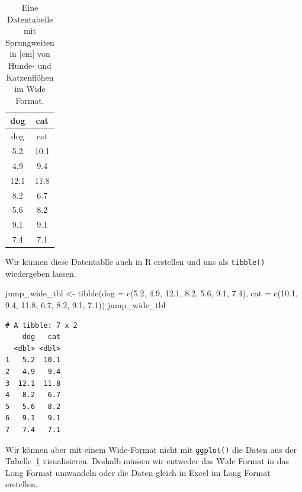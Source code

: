 \documentclass[
  letterpaper,
]{scrbook}
\newenvironment{Shaded}{\begin{snugshade}}{\end{snugshade}}
\newcommand{\AttributeTok}[1]{\textcolor[rgb]{0.40,0.45,0.13}{#1}}
\newcommand{\FloatTok}[1]{\textcolor[rgb]{0.68,0.00,0.00}{#1}}
\newcommand{\FunctionTok}[1]{\textcolor[rgb]{0.28,0.35,0.67}{#1}}
\newcommand{\NormalTok}[1]{\textcolor[rgb]{0.00,0.23,0.31}{#1}}
\newcommand{\OtherTok}[1]{\textcolor[rgb]{0.00,0.23,0.31}{#1}}
\begin{document}
\hypertarget{tbl-imp-cat-dog-wide}{}
\begin{longtable}[]{@{}cc@{}}
\caption{\label{tbl-imp-cat-dog-wide}Eine Datentabelle mit Sprungweiten
in {[}cm{]} von Hunde- und Katzenflöhen im Wide Format.}\tabularnewline
\toprule()
dog & cat \\
\midrule()
\endfirsthead
\toprule()
dog & cat \\
\midrule()
\endhead
5.2 & 10.1 \\
4.9 & 9.4 \\
12.1 & 11.8 \\
8.2 & 6.7 \\
5.6 & 8.2 \\
9.1 & 9.1 \\
7.4 & 7.1 \\
\bottomrule()
\end{longtable}

Wir können diese Datentablle auch in R erstellen und uns als
\texttt{tibble()} wiedergeben lassen.

\begin{Shaded}
\begin{Highlighting}[]
\NormalTok{jump\_wide\_tbl }\OtherTok{\textless{}{-}} \FunctionTok{tibble}\NormalTok{(}\AttributeTok{dog =} \FunctionTok{c}\NormalTok{(}\FloatTok{5.2}\NormalTok{, }\FloatTok{4.9}\NormalTok{, }\FloatTok{12.1}\NormalTok{, }\FloatTok{8.2}\NormalTok{, }\FloatTok{5.6}\NormalTok{, }\FloatTok{9.1}\NormalTok{, }\FloatTok{7.4}\NormalTok{),}
                        \AttributeTok{cat =} \FunctionTok{c}\NormalTok{(}\FloatTok{10.1}\NormalTok{, }\FloatTok{9.4}\NormalTok{, }\FloatTok{11.8}\NormalTok{, }\FloatTok{6.7}\NormalTok{, }\FloatTok{8.2}\NormalTok{, }\FloatTok{9.1}\NormalTok{, }\FloatTok{7.1}\NormalTok{))}
\NormalTok{jump\_wide\_tbl}
\end{Highlighting}
\end{Shaded}

\begin{verbatim}
# A tibble: 7 x 2
    dog   cat
  <dbl> <dbl>
1   5.2  10.1
2   4.9   9.4
3  12.1  11.8
4   8.2   6.7
5   5.6   8.2
6   9.1   9.1
7   7.4   7.1
\end{verbatim}

{}

Wir können aber mit einem Wide-Format nicht mit \texttt{ggplot()} die
Daten aus der Tabelle~\ref{tbl-imp-cat-dog-wide} visualisieren. Deshalb
müssen wir entweder das Wide Format in das Long Format umwandeln oder
die Daten gleich in Excel im Long Format erstellen.
\end{document}
